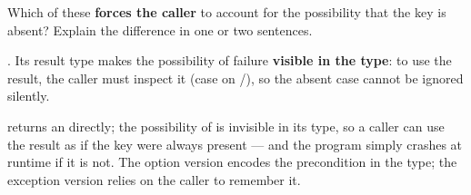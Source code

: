   Which of these \textbf{forces the caller} to account for the possibility that
  the key is absent? Explain the difference in one or two sentences.

  \begin{solutionorbox}[12em]
    . Its result type  makes the possibility of
    failure \textbf{visible in the type}: to use the result, the caller must
    inspect it (case on /), so the absent case cannot be
    ignored silently.

     returns an  directly; the possibility of
     is invisible in its type, so a caller can use the result as
    if the key were always present --- and the program simply crashes at runtime
    if it is not. The option version encodes the precondition in the type; the
    exception version relies on the caller to remember it.
  \end{solutionorbox}
